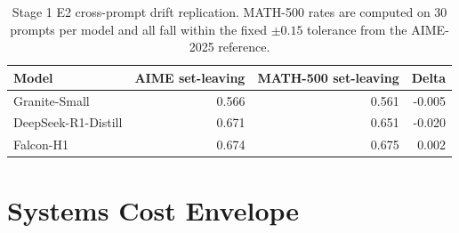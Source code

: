 \documentclass{article}
\begin{document}
\begin{table}[h]
\centering
\small
{}
\caption{Two-trace M-SURFACE diagnostic with SSM internals. SSM input and C generation drift slightly less than post-block, but neither is below 0.30--0.40 or at least 0.15 below post-block, so the complete Granite surface screen does not promote surface-local protection.}
\end{table}

\begin{table}[h]
\centering
\small
\begin{tabular}{@{}lrrr@{}}
\toprule
Model & AIME set-leaving & MATH-500 set-leaving & Delta \\
\midrule
Granite-Small & 0.566 & 0.561 & -0.005 \\
DeepSeek-R1-Distill & 0.671 & 0.651 & -0.020 \\
Falcon-H1 & 0.674 & 0.675 & 0.002 \\
\bottomrule
\end{tabular}
\caption{Stage 1 E2 cross-prompt drift replication. MATH-500 rates are computed on 30 prompts per model and all fall within the fixed $\pm 0.15$ tolerance from the AIME-2025 reference.}
\end{table}

\section{Systems Cost Envelope}
\label{app:systems-envelope}
\end{document}
